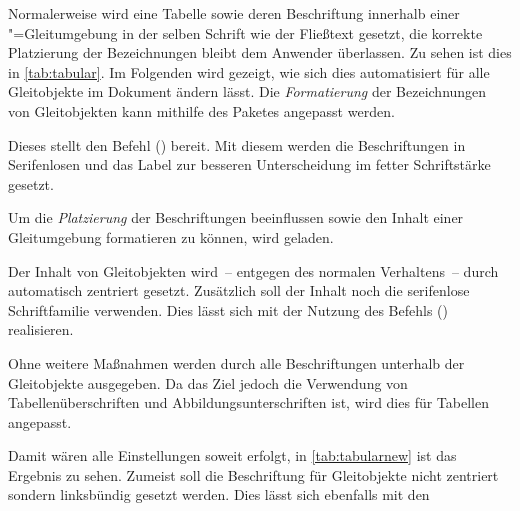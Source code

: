 \documentclass[%
  english,ngerman,%
  cdgeometry=no,DIV=12,%
  automark,%
  listof=toc,%
]{tudscrartcl}
\begin{document}
Normalerweise wird eine Tabelle sowie deren Beschriftung innerhalb einer 
"=Gleitumgebung in der selben Schrift wie der Fließtext 
gesetzt, die korrekte Platzierung der Bezeichnungen bleibt dem Anwender 
überlassen. Zu sehen ist dies in \autoref{tab:tabular}. Im Folgenden wird 
gezeigt, wie sich dies automatisiert für alle Gleitobjekte im Dokument ändern 
lässt. Die \emph{Formatierung} der Bezeichnungen von Gleitobjekten kann 
mithilfe des Paketes  angepasst werden.
%
\begin{Preamble}
\usepackage{caption}
\end{Preamble}
%
Dieses stellt den Befehl () bereit. Mit 
diesem werden die Beschriftungen in Serifenlosen und das Label zur besseren 
Unterscheidung im fetter Schriftstärke gesetzt.
%
\begin{Preamble*}
\captionsetup{font=sf,labelfont=bf,labelsep=space}
\end{Preamble*}
%
Um die \emph{Platzierung} der Beschriftungen beeinflussen sowie den Inhalt 
einer Gleitumgebung formatieren zu können, wird  geladen. 
\begin{Preamble}
\usepackage{floatrow}
\end{Preamble}
%
Der Inhalt von Gleitobjekten wird~-- entgegen des normalen Verhaltens~-- durch 
 automatisch zentriert gesetzt. Zusätzlich soll der Inhalt 
noch die serifenlose Schriftfamilie verwenden. Dies lässt sich mit der Nutzung 
des Befehls () realisieren.
%
\begin{Preamble*}
\end{Preamble*}
%
Ohne weitere Maßnahmen werden durch  alle Beschriftungen 
unterhalb der Gleitobjekte ausgegeben. Da das Ziel jedoch die Verwendung von 
Tabellenüberschriften und Abbildungsunterschriften ist, wird dies für Tabellen
angepasst.
%
\begin{Preamble*}
\end{Preamble*}
%
\begin{table}
\end{table}%
%
Damit wären alle Einstellungen soweit erfolgt, in \autoref{tab:tabularnew} ist 
das Ergebnis zu sehen. Zumeist soll die Beschriftung für Gleitobjekte nicht 
zentriert sondern linksbündig gesetzt werden. Dies lässt sich ebenfalls mit den 
\end{document}

